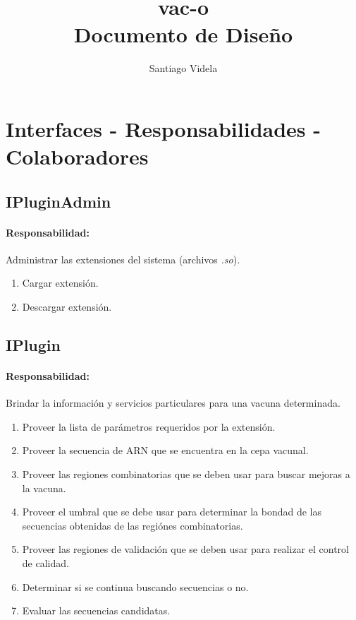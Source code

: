 \documentclass[a4paper,10pt]{article}
\author{Santiago Videla}
\title{vac-o\\ Documento de Dise\~no}
\begin{document}
\maketitle
\newpage
\tableofcontents
\newpage

\section{Interfaces - Responsabilidades - Colaboradores}
  \subsection{IPluginAdmin}
    \paragraph{Responsabilidad:} Administrar las extensiones del sistema
(archivos \textit{.so}).    
      \begin{enumerate}
       \item Cargar extensi\'on.
       \item Descargar extensi\'on.
      \end{enumerate}    

  \subsection{IPlugin}
    \paragraph{Responsabilidad:} Brindar la informaci\'on y servicios
particulares para una vacuna determinada.    
      \begin{enumerate}
       \item Proveer la lista de par\'ametros requeridos por la extensi\'on.
       \item Proveer la secuencia de ARN que se encuentra en la cepa vacunal.
       \item Proveer las regiones combinatorias que se deben usar para buscar
mejoras a la vacuna.
       \item Proveer el umbral que se debe usar para determinar la bondad de las
secuencias obtenidas de las regi\'ones combinatorias.
       \item Proveer las regiones de validaci\'on que se deben usar para
realizar el control de calidad.
       \item Determinar si se continua buscando secuencias o no.
       \item Evaluar las secuencias candidatas.
      \end{enumerate}
\end{document}
